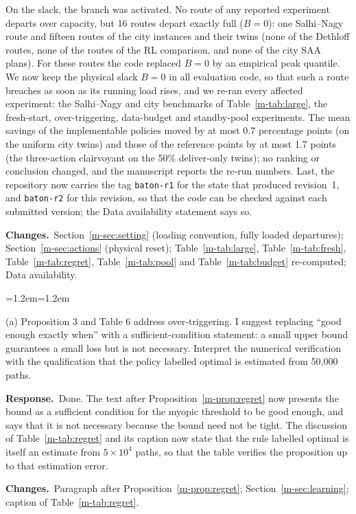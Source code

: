 \documentclass[11pt]{article}
\newenvironment{comment}{\par\medskip\noindent\color{rev}\itshape
  \begin{list}{}{\leftmargin=1.2em\rightmargin=1.2em}\item[]}%
  {\end{list}\par}
\newcommand{\resp}{\par\noindent\textbf{Response.}\ }
\newcommand{\chg}{\par\noindent\textbf{Changes.}\ }
\newcommand{\sref}[1]{Section~\ref{m-#1}}
\newcommand{\tref}[1]{Table~\ref{m-#1}}
\newcommand{\pref}[1]{Proposition~\ref{m-#1}}
\begin{document}
On the slack, the branch was activated. No route of any reported
experiment departs over capacity, but 16 routes depart exactly full
($B = 0$): one Salhi--Nagy route and fifteen routes of the city
instances and their twins (none of the Dethloff routes, none of the
routes of the RL comparison, and none of the city \textsc{SAA} plans).
For these routes the code replaced $B = 0$ by an empirical peak
quantile. We now keep the physical slack $B = 0$ in all evaluation
code, so that such a route breaches as soon as its running load rises,
and we re-ran every affected experiment: the Salhi--Nagy and city
benchmarks of \tref{tab:large}, the fresh-start, over-triggering,
data-budget and standby-pool experiments. The mean savings of the
implementable policies moved by at most 0.7 percentage points (on the
uniform city twins) and those of the reference points by at most 1.7
points (the three-action clairvoyant on the 50\% deliver-only twins); no
ranking or conclusion changed, and the manuscript reports the re-run
numbers. Last,
the repository now carries the tag \texttt{baton-r1} for the state that
produced revision~1, and \texttt{baton-r2} for this revision, so that the
code can be checked against each submitted version; the Data
availability statement says so.
\chg \sref{sec:setting} (loading convention, fully loaded departures);
\sref{sec:actions} (physical reset); \tref{tab:large}, \tref{tab:fresh},
\tref{tab:regret}, \tref{tab:pool} and \tref{tab:budget} re-computed;
Data availability.

\begin{comment}
(a) Proposition 3 and Table 6 address over-triggering. I suggest
replacing ``good enough exactly when'' with a sufficient-condition
statement: a small upper bound guarantees a small loss but is not
necessary. Interpret the numerical verification with the qualification
that the policy labelled optimal is estimated from 50,000 paths.
\end{comment}
\resp Done. The text after \pref{prop:regret} now presents the bound as a
sufficient condition for the myopic threshold to be good enough, and
says that it is not necessary because the bound need not be tight. The
discussion of \tref{tab:regret} and its caption now state that the rule
labelled optimal is itself an estimate from $5\times10^4$ paths, so that
the table verifies the proposition up to that estimation error.
\chg Paragraph after \pref{prop:regret}; \sref{sec:learning};
caption of \tref{tab:regret}.
\end{document}
